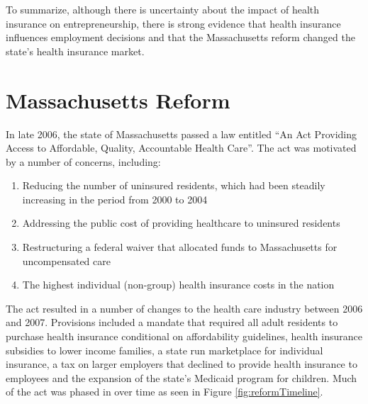 \documentclass[12pt]{article}
\begin{document}
\begin{comment}

The taxation literature has also explored how
workers might value benefits that are funded by taxes, see Gruber [9]. We contribute
by providing a novel setting to test the relationship between expected taxation and
self-employment.

\end{comment}

To summarize, although there is uncertainty about the impact of health insurance on entrepreneurship, there is strong evidence that health insurance influences employment decisions  and that the Massachusetts reform changed the state's health insurance market. 

\section{Massachusetts Reform}
\label{sec:reform}


In late 2006, the state of Massachusetts passed a law entitled ``An Act Providing Access to Affordable, Quality, Accountable Health Care''. The act was motivated by a number of concerns, including:

\begin{enumerate}
\item Reducing the number of uninsured residents, which had been steadily increasing in the period from 2000 to 2004 \cite{bisweek}
\item Addressing the public cost of providing healthcare to uninsured residents \cite{npr}
\item Restructuring a federal waiver that allocated funds to Massachusetts for uncompensated care \cite{heritage}
\item The highest individual (non-group) health insurance costs in the nation \cite{gruber}
\end{enumerate}

The act resulted in a number of changes to the health care industry between 2006 and 2007. Provisions included a mandate that required all adult residents to purchase health insurance conditional on affordability guidelines, health insurance subsidies to lower income families, a state run marketplace for individual insurance, a tax on larger employers that declined to provide health insurance to employees and the expansion of the state's Medicaid program for children. Much of the act was phased in over time as seen in Figure \ref{fig:reformTimeline}.
\end{document}
